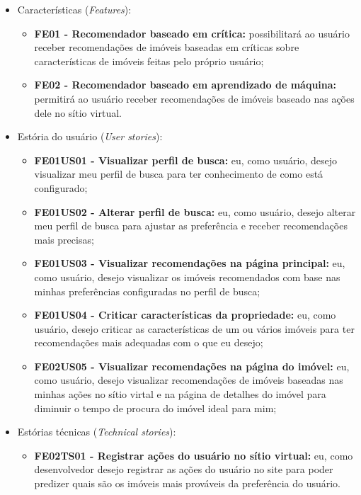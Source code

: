 \begin{itemize}
    \item Características (\textit{Features}):
    \begin{itemize}
        \item \textbf{FE01 - Recomendador baseado em crítica:} possibilitará ao usuário receber recomendações de imóveis baseadas em críticas sobre características de imóveis feitas pelo próprio usuário;

        \item \textbf{FE02 - Recomendador baseado em aprendizado de máquina:} permitirá ao usuário receber recomendações de imóveis baseado nas ações dele no sítio virtual.
    \end{itemize}
    
    \item Estória do usuário (\textit{User stories}):
    \begin{itemize}
        \item \textbf{FE01US01 - Visualizar perfil de busca:} eu, como usuário, desejo visualizar meu perfil de busca para ter conhecimento de como está configurado;
        
        \item \textbf{FE01US02 - Alterar perfil de busca:} eu, como usuário, desejo alterar meu perfil de busca para ajustar as preferência e receber recomendações mais precisas;
        
        \item \textbf{FE01US03 - Visualizar recomendações na página principal:} eu, como usuário, desejo visualizar os imóveis recomendados com base nas minhas preferências configuradas no perfil de busca;
        
        \item \textbf{FE01US04 - Criticar características da propriedade:} eu, como usuário, desejo criticar as características de um ou vários imóveis para ter recomendações mais adequadas com o que eu desejo;
        
        \item \textbf{FE02US05 - Visualizar recomendações na página do imóvel:} eu, como usuário, desejo visualizar recomendações de imóveis baseadas nas minhas ações no sítio virtal e na página de detalhes do imóvel para diminuir o tempo de procura do imóvel ideal para mim;
    \end{itemize}
    
    \item Estórias técnicas (\textit{Technical stories}):
    \begin{itemize}
        \item \textbf{FE02TS01 - Registrar ações do usuário no sítio virtual:} eu, como desenvolvedor desejo registrar as ações do usuário no site para poder predizer quais são os imóveis mais prováveis da preferência do usuário.
    \end{itemize}
\end{itemize}

